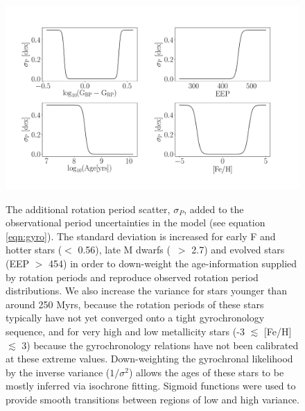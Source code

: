 \begin{figure}
  \caption{
    The additional rotation period scatter, $\sigma_P$, added to the
    observational period uncertainties in the model (see equation
    \ref{eqn:gyro}).
    The standard deviation is increased for early F and hotter
    stars (\gcolor $<$ 0.56), late M dwarfs (\gcolor\ $>$ 2.7) and evolved
    stars (EEP $>$ 454) in order to down-weight the age-information supplied
    by rotation periods and reproduce observed rotation period distributions.
    We also increase the variance for stars younger than around 250 Myrs,
    because the rotation periods of these stars typically have not yet
    converged onto a tight gyrochronology sequence, and for very high and low
    metallicity stars (-3 $\lesssim$ [Fe/H] $\lesssim$ 3) because the
    gyrochronology relations have not been calibrated at these extreme values.
    Down-weighting the gyrochronal likelihood by the inverse variance
    ($1/\sigma^2$) allows the ages of these stars to be mostly inferred
    via isochrone fitting.
    Sigmoid functions were used to provide smooth transitions between regions
    of low and high variance.
}
  \centering
    \includegraphics[width=1.\textwidth]{variance}
\label{fig:variance}
\end{figure}

